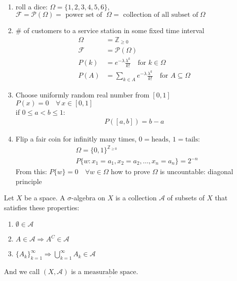 \documentclass[11pt]{article}
\begin{document}
\begin{example}
    \, 

    \begin{enumerate}
        \item roll a dice: $ \Omega = \{1,2,3,4,5,6 \}$, 
        $\mathcal{F} = \mathcal{P}(\Omega) = \text{ power set of }
        \; \Omega = \text{ collection of all subset of} \; \Omega$
        \item \# of customers to a service station in some fixed time interval 
                \begin{align*}
                    \Omega &= \mathbb{Z}_{\ge 0} \\
                    \mathcal{F} &= \mathcal{P}(\Omega)\\
                    P(k) &= e^{-\lambda }\frac{\lambda^k}{k!} \quad \text{for }k \in \Omega\\
                    P(A) &= \sum_{k \in A} e^{-\lambda }\frac{\lambda^k}{k!} \quad \text{for } A \subseteq \Omega
                \end{align*}
        \item Choose uniformly random real number from $[0,1]$ \\
                $P(x) = 0 \quad \forall \, x \in [0,1]$ \\
                if $0 \le a < b \le 1$:
                \begin{align*}
                    P([a,b]) = b-a
                \end{align*}
        \item \label{example:1.1.4} 
                Flip a fair coin for infinitly many times, $0 = \text{heads}, \, 1=\text{tails}$:
                \begin{align*}
                    &\Omega = \{0,1\}^{\mathbb{Z}_{\ge 0}} \\
                    &P\{w: x_1 = a_1, x_2=a_2, \ldots , x_n = a_n\} = 2^{-n} \label{*} \tag{*}
                \end{align*}
                From this: $P\{w\} = 0 \quad \forall w \in \Omega$
                \remark how to prove $\Omega$ is uncountable: diagonal principle
    \end{enumerate}
\end{example}

\begin{definition}
    Let $X$ be a space. A $\sigma$-algebra on $X$ is a collection $\mathcal{A}$ of subsets of $X$ that
    satisfies these properties:
    \begin{enumerate}
        \item $\emptyset \in \mathcal{A}$
        \item $A \in \mathcal{A} \Longrightarrow  A^C \in \mathcal{A}$
        \item $\{A_k \}_{k=1}^{\infty} \Longrightarrow \bigcup_{k=1}^{\infty}A_k \in \mathcal{A}$ 
    \end{enumerate}
    And we call $(X, \mathcal{A})$ is a $\underline{\text{measurable space}}$.
\end{definition}
\end{document}
